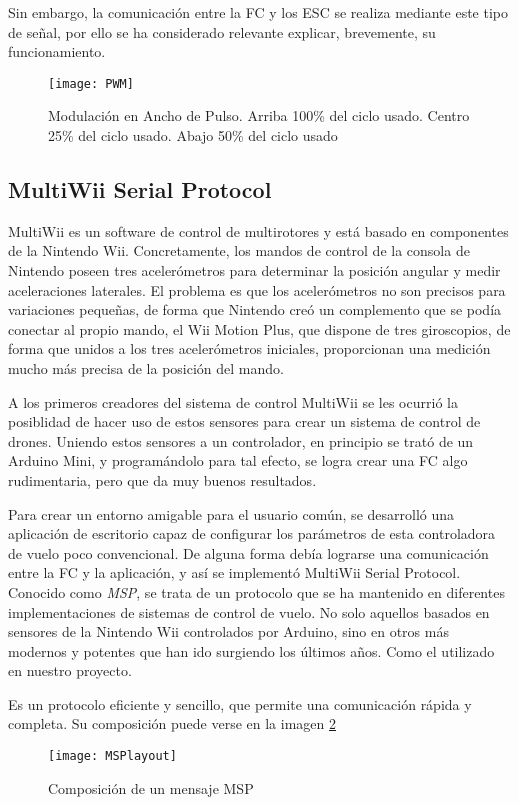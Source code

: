 Sin embargo, la comunicación entre la FC y los ESC se realiza mediante este tipo de señal, por ello se ha considerado relevante explicar, brevemente, su funcionamiento.
\begin{figure}
	\centering
	\texttt{[image: PWM]}
	\caption{Modulación en Ancho de Pulso. Arriba 100\% del ciclo usado. Centro 25\% del ciclo usado. Abajo 50\% del ciclo usado}\label{fig:PWM}
\end{figure}


\subsection{MultiWii Serial Protocol}
\label{subsec:MSP}

MultiWii es un software de control de multirotores y está basado en componentes de la Nintendo Wii. Concretamente, los mandos de control de la consola de Nintendo poseen tres acelerómetros para determinar la posición angular y medir aceleraciones laterales. El problema es que los acelerómetros no son precisos para variaciones pequeñas, de forma que Nintendo creó un complemento que se podía conectar al propio mando, el Wii Motion Plus, que dispone de tres giroscopios, de forma que unidos a los tres acelerómetros iniciales, proporcionan una medición mucho más precisa de la posición del mando.

A los primeros creadores del sistema de control MultiWii se les ocurrió la posiblidad de hacer uso de estos sensores para crear un sistema de control de drones. Uniendo estos sensores a un controlador, en principio se trató de un Arduino Mini, y programándolo para tal efecto, se logra crear una FC algo rudimentaria, pero que da muy buenos resultados.

Para crear un entorno amigable para el usuario común, se desarrolló una aplicación de escritorio capaz de configurar los parámetros de esta controladora de vuelo poco convencional. De alguna forma debía lograrse una comunicación entre la FC y la aplicación, y así se implementó MultiWii Serial Protocol.\\Conocido como \textit{MSP}, se trata de un protocolo que se ha mantenido en diferentes implementaciones de sistemas de control de vuelo. No solo aquellos basados en sensores de la Nintendo Wii controlados por Arduino, sino en otros más modernos y potentes que han ido surgiendo los últimos años. Como el utilizado en nuestro proyecto.

Es un protocolo eficiente y sencillo, que permite una comunicación rápida y completa. Su composición puede verse en la imagen \ref{fig:MSPlayout}
\begin{figure}
	\centering
	\texttt{[image: MSPlayout]}
	\caption{Composición de un mensaje MSP}\label{fig:MSPlayout}
\end{figure}

